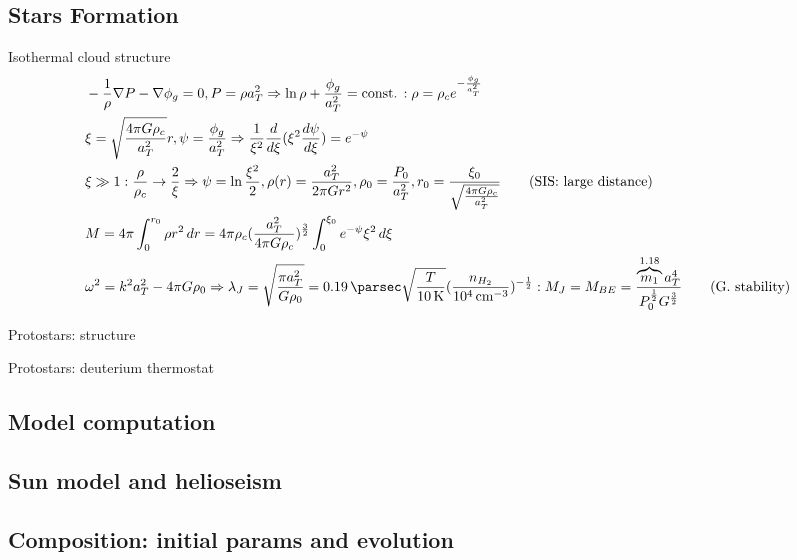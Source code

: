 \subsection{Stars Formation}


\begin{frame}{Isothermal cloud structure}
    \begin{align*}
        &-\frac{1}{\rho}\nabla P-\nabla\phi_g=0, P=\rho a_T^2\Rightarrow \ln{\rho}+\frac{\phi_g}{a_T^2}=\const{}:\rho=\rho_c\exp{-\frac{\phi_g}{a_T^2}}\\
        &\xi=\sqrt{\frac{4\pi G\rho_c}{a_T^2}}r, \psi=\frac{\phi_g}{a_T^2}\Rightarrow \frac{1}{\xi^2}\TDof{\xi}(\xi^2\TDy{\xi}{\psi})=\exp{-\psi}\\
        &\xi\gg1: \frac{\rho}{\rho_c}\to \frac{2}{\xi}\Rightarrow \psi=\ln{\frac{\xi^2}{2}}, \rho(r)=\frac{a_T^2}{2\pi Gr^2},\rho_0=\frac{P_0}{a_T^2}, r_0=\frac{\xi_0}{\sqrt{\frac{4\pi G\rho_c}{a_T^2}}}\tag{SIS: large distance}\\
        &M=4\pi\int_0^{r_0}\rho r^2\,dr= 4\pi\rho_c(\frac{a_T^2}{4\pi G\rho_c})^{\frac{3}{2}}\int_0^{\xi_0}\exp{-\psi}\xi^2\,d\xi\\
        &\omega^2=k^2a_T^2-4\pi G\rho_0\Rightarrow \lambda_J=\sqrt{\frac{\pi a_T^2}{G\rho_0}}=\SI{0.19}{\parsec}\sqrt{\frac{T}{\SI{10}{\kelvin}}}(\frac{n_{H_2}}{\SI{e4}{\per\cubic\cm}})^{-\frac{1}{2}}: M_J=M_{BE}=\frac{\overbrace{m_1}^{1.18} a_T^4}{P_0^{\frac{1}{2}}G^{\frac{3}{2}}}\tag{G. stability}
    \end{align*}
\end{frame}

\begin{frame}{Protostars: structure}
    
\end{frame}

\begin{frame}{Protostars: deuterium thermostat}
    
\end{frame}

\subsection{Model computation}

 \subsection{Sun model and helioseism}

\subsection{Composition: initial params and evolution}

